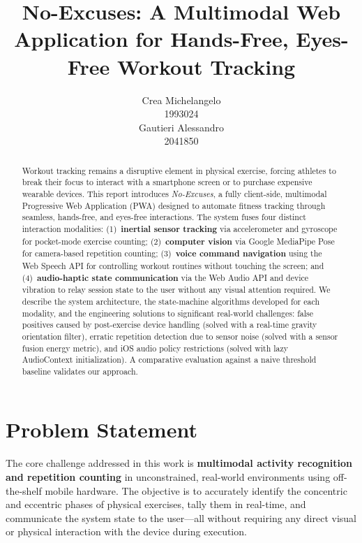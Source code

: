 \documentclass[11pt]{article}
\title{No-Excuses: A Multimodal Web Application for Hands-Free, Eyes-Free Workout Tracking}
\author{
 Crea Michelangelo \\
  1993024 \\
  \And
  Gautieri Alessandro \\
  2041850 \\
}
\date{}
\begin{document}
\maketitle

\begin{abstract}
Workout tracking remains a disruptive element in physical exercise, forcing athletes to break their focus to interact with a smartphone screen or to purchase expensive wearable devices. This report introduces \textit{No-Excuses}, a fully client-side, multimodal Progressive Web Application (PWA) designed to automate fitness tracking through seamless, hands-free, and eyes-free interactions. The system fuses four distinct interaction modalities: (1)~\textbf{inertial sensor tracking} via accelerometer and gyroscope for pocket-mode exercise counting; (2)~\textbf{computer vision} via Google MediaPipe Pose for camera-based repetition counting; (3)~\textbf{voice command navigation} using the Web Speech API for controlling workout routines without touching the screen; and (4)~\textbf{audio-haptic state communication} via the Web Audio API and device vibration to relay session state to the user without any visual attention required. We describe the system architecture, the state-machine algorithms developed for each modality, and the engineering solutions to significant real-world challenges: false positives caused by post-exercise device handling (solved with a real-time gravity orientation filter), erratic repetition detection due to sensor noise (solved with a sensor fusion energy metric), and iOS audio policy restrictions (solved with lazy AudioContext initialization). A comparative evaluation against a naive threshold baseline validates our approach.
\end{abstract}
\newpage
\section{Problem Statement}

The core challenge addressed in this work is \textbf{multimodal activity recognition and repetition counting} in unconstrained, real-world environments using off-the-shelf mobile hardware. The objective is to accurately identify the concentric and eccentric phases of physical exercises, tally them in real-time, and communicate the system state to the user—all without requiring any direct visual or physical interaction with the device during execution.
\end{document}
